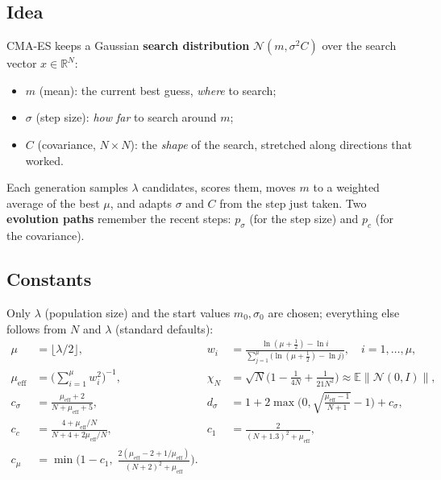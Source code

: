 \documentclass[11pt,a4paper]{article}
\begin{document}
\subsection{Idea}
CMA-ES keeps a Gaussian \textbf{search distribution} $\mathcal{N}(m, \sigma^2 C)$ over the search vector
$x \in \mathbb{R}^N$:
\begin{itemize}
  \item $m$ (mean): the current best guess, \emph{where} to search;
  \item $\sigma$ (step size): \emph{how far} to search around $m$;
  \item $C$ (covariance, $N \times N$): the \emph{shape} of the search, stretched along directions that worked.
\end{itemize}
Each generation samples $\lambda$ candidates, scores them, moves $m$ to a weighted average of the best $\mu$, and
adapts $\sigma$ and $C$ from the step just taken. Two \textbf{evolution paths} remember the recent steps:
$p_\sigma$ (for the step size) and $p_c$ (for the covariance).

\subsection{Constants}
Only $\lambda$ (population size) and the start values $m_0, \sigma_0$ are chosen; everything else follows from
$N$ and $\lambda$ (standard defaults):
\begin{align*}
  \mu &= \lfloor \lambda/2 \rfloor, &
  w_i &= \frac{\ln(\mu + \tfrac12) - \ln i}{\sum_{j=1}^{\mu} \big(\ln(\mu + \tfrac12) - \ln j\big)},\quad i = 1, \dots, \mu, \\
  \mu_{\mathrm{eff}} &= \Big(\sum_{i=1}^{\mu} w_i^2\Big)^{-1}, &
  \chi_N &= \sqrt{N}\Big(1 - \tfrac{1}{4N} + \tfrac{1}{21N^2}\Big) \approx \mathbb{E}\|\mathcal{N}(0, I)\|, \\
  c_\sigma &= \frac{\mu_{\mathrm{eff}} + 2}{N + \mu_{\mathrm{eff}} + 5}, &
  d_\sigma &= 1 + 2\max\Big(0, \sqrt{\tfrac{\mu_{\mathrm{eff}} - 1}{N + 1}} - 1\Big) + c_\sigma, \\
  c_c &= \frac{4 + \mu_{\mathrm{eff}}/N}{N + 4 + 2\mu_{\mathrm{eff}}/N}, &
  c_1 &= \frac{2}{(N + 1.3)^2 + \mu_{\mathrm{eff}}}, \\
  c_\mu &= \min\Big(1 - c_1,\; \frac{2(\mu_{\mathrm{eff}} - 2 + 1/\mu_{\mathrm{eff}})}{(N + 2)^2 + \mu_{\mathrm{eff}}}\Big). &&
\end{align*}
\end{document}
